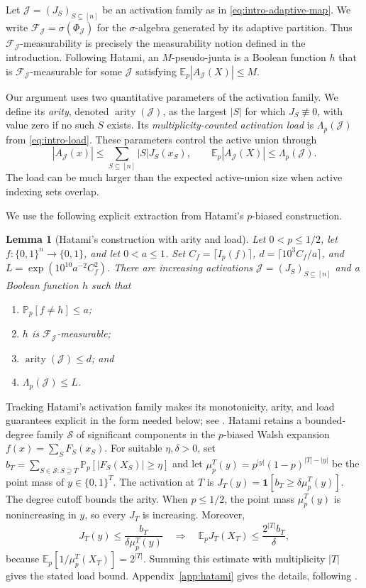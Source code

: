 \documentclass[11pt,letterpaper]{article}
\newtheorem{lemma}[theorem]{Lemma}
\theoremstyle{definition}
\theoremstyle{remark}
\newcommand{\bits}{\{0,1\}}
\newcommand{\E}{\mathbb E}
\renewcommand{\Pr}{\mathbb P}
\newcommand{\one}{\mathbf 1}
\newcommand{\cF}{\mathcal F}
\newcommand{\cJ}{\mathcal J}
\newcommand{\cS}{\mathcal S}
\begin{document}
Let $\cJ=(J_S)_{S\subseteq[n]}$ be an activation family as in
\eqref{eq:intro-adaptive-map}.  We write
$\cF_{\cJ}=\sigma(\Phi_{\cJ})$ for the $\sigma$-algebra generated by its adaptive
partition.  Thus $\cF_{\cJ}$-measurability is precisely the measurability
notion defined in the introduction.  Following Hatami, an $M$-pseudo-junta is
a Boolean function $h$ that is $\cF_{\cJ}$-measurable for some $\cJ$ satisfying
$\E_p|A_{\cJ}(X)|\le M$.

Our argument uses two quantitative parameters of the activation family.  We
define its \emph{arity}, denoted $\operatorname{arity}(\cJ)$, as the largest $|S|$ for which
$J_S\not\equiv0$, with value zero if no such $S$ exists.  Its
\emph{multiplicity-counted activation load} is $\Lambda_p(\cJ)$ from
\eqref{eq:intro-load}.  These parameters control the active union through
\begin{equation}
\label{eq:union-load}
       |A_{\cJ}(x)|
       \le\sum_{S\subseteq[n]}|S|J_S(x_S),
       \qquad
       \E_p|A_{\cJ}(X)|\le\Lambda_p(\cJ).
\end{equation}
The load can be much larger than the expected active-union size when active
indexing sets overlap.

We use the following explicit extraction from Hatami's $p$-biased construction.

\begin{lemma}[Hatami's construction with arity and load]
\label{lem:hatami-input}
Let $0<p\le1/2$, let $f:\bits^n\to\bits$, and let $0<a\le1$.  Set
$C_f=\lceil I_p(f)\rceil$,
$d=\lceil 10^3C_f/a\rceil$, and
$L=\exp(10^{10}a^{-2}C_f^2)$.
There are increasing activations $\cJ=(J_S)_{S\subseteq[n]}$ and a Boolean
function $h$ such that
\begin{enumerate}[label=\textup{(\roman*)},nosep]
\item $\Pr_p[f\ne h]\le a$;
\item $h$ is $\cF_{\cJ}$-measurable;
\item $\operatorname{arity}(\cJ)\le d$; and
\item $\Lambda_p(\cJ)\le L$.
\end{enumerate}
\end{lemma}

Tracking Hatami's activation family makes its monotonicity, arity, and load
guarantees explicit in the form needed below; see
\cite[Remark~2.9 and Sections~4.3--4.4]{Hatami2012}.  Hatami retains a
bounded-degree family $\cS$ of significant
components in the $p$-biased Walsh expansion
$f(x)=\sum_S F_S(x_S)$.  For
suitable $\eta,\delta>0$, set
$b_T=\sum_{S\in\cS:S\supseteq T}\Pr_p[|F_S(X_S)|\ge\eta]$ and let
$\mu_p^T(y)=p^{|y|}(1-p)^{|T|-|y|}$ be the point mass of $y\in\bits^T$.  The
activation at $T$ is $J_T(y)=\one[b_T\ge\delta\mu_p^T(y)]$.  The degree cutoff
bounds the arity.  When $p\le1/2$, the point mass $\mu_p^T(y)$ is
nonincreasing in $y$, so every $J_T$ is increasing.  Moreover,
\[
       J_T(y)\le\frac{b_T}{\delta\mu_p^T(y)}
       \quad\Longrightarrow\quad
       \E_pJ_T(X_T)\le\frac{2^{|T|}b_T}{\delta},
\]
because $\E_p[1/\mu_p^T(X_T)]=2^{|T|}$.  Summing this estimate with
multiplicity $|T|$ gives the stated load bound.  Appendix~\ref{app:hatami}
gives the details, following \cite[Sections~4.1--4.4]{Hatami2012}.
\end{document}

